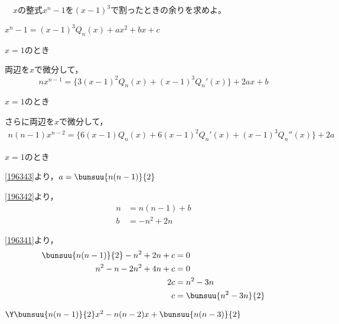 \begin{problem}
    　$x$の整式$x^n-1$を${(x-1)}^3$で割ったときの余りを求めよ。
\end{problem}

$x^n - 1 = (x-1)^3 Q_n(x) + ax^2 + bx + c$

$x=1$のとき\qquad {}

両辺を$x$で微分して，
\[nx^{n-1} = \{3(x-1)^2Q_n(x) + (x-1)^3Q_n'(x)\} + 2ax + b\]

$x=1$のとき\qquad {}

さらに両辺を$x$で微分して，
\begin{align*}
    n(n-1)x^{n-2} =
    \{6(x-1)Q_n(x) + 6(x-1)^2Q_n'(x) +(x-1)^3Q_n''(x) \}+ 2a
\end{align*}

$x=1$のとき\qquad {}

\eqref{196343}より，$a = \bunsuu{n(n-1)}{2}$

\eqref{196342}より，\begin{align*}
    n &= n(n-1) + b\\
    b &= -n^2 + 2n
\end{align*}

\eqref{196341}より，\begin{align*}
    \bunsuu{n(n-1)}{2} - n^2 + 2n + c &= 0\\
    n^2 - n -2n^2 + 4n + c &= 0 \\
    2c &= n^2 - 3n\\
    c &= \bunsuu{n^2 - 3n}{2}
\end{align*}

\hfill
$\Y \bunsuu{n(n-1)}{2}x^2 - n(n-2)x + \bunsuu{n(n-3)}{2}$
